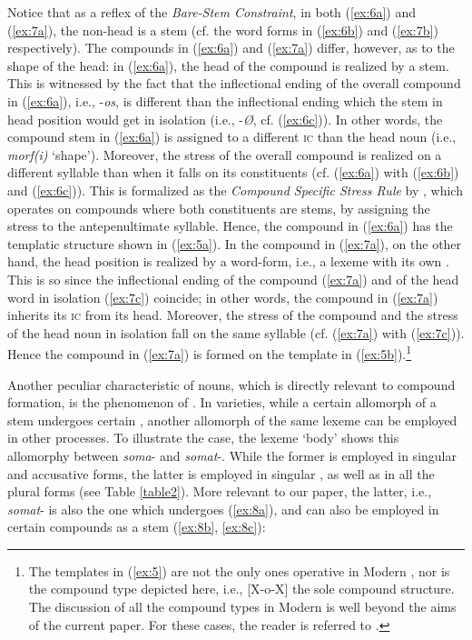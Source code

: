 \documentclass[output=paper]{LSP/langsci}
\begin{document}
Notice that as a reflex of the \textit{Bare-Stem Constraint}, in both (\ref{ex:6a}) and (\ref{ex:7a}), the non-head is a stem (cf. the word forms in (\ref{ex:6b}) and (\ref{ex:7b}) respectively). The compounds in  (\ref{ex:6a}) and  (\ref{ex:7a}) differ, however, as to the shape of the head: in (\ref{ex:6a}), the head of the compound is realized by a stem. This is witnessed by the fact that the inflectional ending of the overall compound in (\ref{ex:6a}), i.e., -\textit{os}, is different than the inflectional ending which the stem in head position would get in isolation (i.e., -\textit{\O}, cf. (\ref{ex:6c})). In other words, the compound stem in (\ref{ex:6a}) is assigned to a different \textsc{ic} than the head noun (i.e., \textit{morf(i)} `shape'). Moreover, the stress of the overall compound is realized on a different syllable than when it falls on its constituents (cf. (\ref{ex:6a}) with (\ref{ex:6b}) and (\ref{ex:6c})). This is formalized as the \textit{Compound Specific Stress Rule} by \citet{NesporRalli1996}, which operates on compounds where both constituents are stems, by assigning the stress to the antepenultimate syllable. Hence, the compound in (\ref{ex:6a}) has the templatic structure shown in (\ref{ex:5a}). In the compound in (\ref{ex:7a}), on the other hand, the head position is realized by a word-form, i.e., a lexeme with its own . This is so since the inflectional ending of the compound (\ref{ex:7a}) and of the head word in isolation (\ref{ex:7c}) coincide; in other words, the compound in (\ref{ex:7a}) inherits its \textsc{ic} from its head. Moreover, the stress of the compound and the stress of the head noun in isolation fall on the same syllable (cf. (\ref{ex:7a}) with (\ref{ex:7c})). Hence the compound in (\ref{ex:7a}) is formed on the template in (\ref{ex:5b}).\footnote{The templates in (\ref{ex:5}) are not the only ones operative in Modern , nor is the compound type depicted here, i.e., [X-o-X] the sole compound structure. The discussion of all the compound types in Modern  is well beyond the aims of the current paper. For these cases, the reader is referred to \citet{Ralli2013moderngreek}.}

Another peculiar characteristic of  nouns, which is directly relevant to compound formation, is the phenomenon of . In  varieties, while a certain allomorph of a stem undergoes certain , another allomorph of the same lexeme can be employed in other  processes. To illustrate the case, the lexeme `body' shows this allomorphy between \textit{soma}- and \textit{somat}-. While the former is employed in singular  and accusative forms, the latter is employed in singular , as well as in all the plural forms (see Table \ref{table2}). More relevant to our paper, the latter, i.e., \textit{somat}- is also the one which undergoes  (\ref{ex:8a}), and can also be employed in certain compounds as a stem (\ref{ex:8b}, \ref{ex:8c}):
\end{document}
